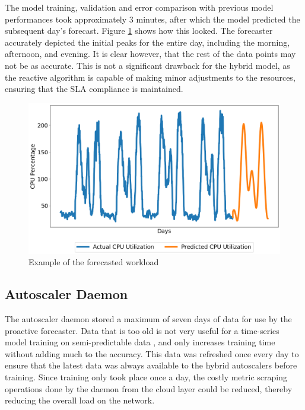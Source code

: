 The model training, validation and error comparison with previous model performances took approximately 3 minutes, after which the model predicted the subsequent day's forecast. Figure \ref{fig:lstm-final-data} shows how this looked. The forecaster accurately depicted the initial peaks for the entire day, including the morning, afternoon, and evening. It is clear however, that the rest of the data points may not be as accurate. This is not a significant drawback for the hybrid model, as the reactive algorithm is capable of making minor adjustments to the resources, ensuring that the SLA compliance is maintained.

\begin{figure}[htb]
    \centering
    \caption{Example of the forecasted workload}
    \label{fig:lstm-final-data}
    \includegraphics[width=1.0\linewidth]{Figures/LSTM-Final-Data.png}
\end{figure}

\subsection{Autoscaler Daemon}
\label{subsec:ch4-auto-daemon-subsection}

The autoscaler daemon stored a maximum of seven days of data for use by the proactive forecaster. Data that is too old is not very useful for a time-series model training on semi-predictable data \cite{greff2016lstm}, and only increases training time without adding much to the accuracy. This data was refreshed once every day to ensure that the latest data was always available to the hybrid autoscalers before training. Since training only took place once a day, the costly metric scraping operations done by the daemon from the cloud layer could be reduced, thereby reducing the overall load on the network.\par


